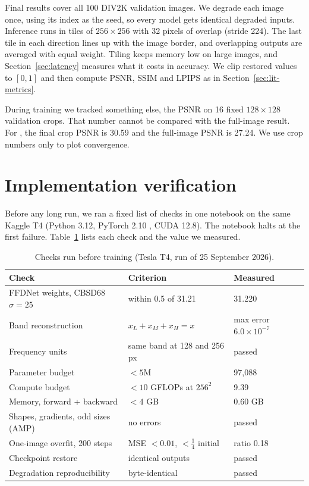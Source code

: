 Final results cover all 100 DIV2K validation images. We degrade each image
once, using its index as the seed, so every model gets identical degraded
inputs. Inference runs in tiles of $256\times256$ with 32 pixels of overlap
(stride 224). The last tile in each direction lines up with the image border,
and overlapping outputs are averaged with equal weight. Tiling keeps memory
low on large images, and Section~\ref{sec:latency} measures what it costs in
accuracy. We clip restored values to $[0,1]$ and then compute PSNR, SSIM and
LPIPS as in Section~\ref{sec:lit-metrics}.

During training we tracked something else, the PSNR on 16 fixed
$128\times128$ validation crops. That number cannot be compared with the
full-image result. For \fcsg{}, the final crop PSNR is 30.59\dB{} and the
full-image PSNR is 27.24\dB{}. We use crop numbers only to plot convergence.

\section{Implementation verification}\label{sec:verification}

Before any long run, we ran a fixed list of checks in one notebook on the
same Kaggle T4 (Python 3.12, PyTorch 2.10 \cite{paszke2019pytorch}, CUDA 12.8).
The notebook halts at the first failure. Table~\ref{tab:gates} lists each
check and the value we measured.

\begin{table}[htbp]
	\centering
	\caption{Checks run before training (Tesla T4, run of 25 September 2026).}
	\small
	\label{tab:gates}
	\begin{tabular}{@{}lll@{}}
		\toprule
		Check & Criterion & Measured \\
		\midrule
		FFDNet weights, CBSD68 $\sigma{=}25$ & within 0.5\dB{} of 31.21 & 31.220\dB \\
		Band reconstruction & $x_L{+}x_M{+}x_H = x$ & max error $6.0\times10^{-7}$ \\
		Frequency units & same band at 128 and 256 px & passed \\
		Parameter budget & $< 5$M & 97,088 \\
		Compute budget & $< 10$ GFLOPs at $256^2$ & 9.39 \\
		Memory, forward + backward & $< 4$ GB & 0.60 GB \\
		Shapes, gradients, odd sizes (AMP) & no errors & passed \\
		One-image overfit, 200 steps & MSE $<0.01$, $<\frac14$ initial & ratio 0.18 \\
		Checkpoint restore & identical outputs & passed \\
		Degradation reproducibility & byte-identical & passed \\
		\bottomrule
	\end{tabular}
\end{table}

